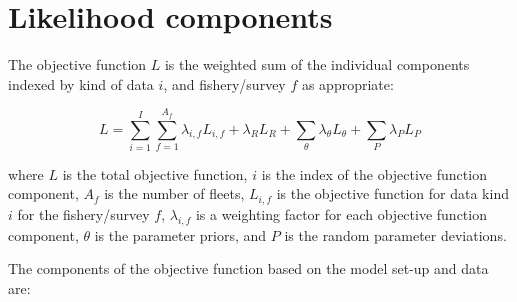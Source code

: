 \section{Likelihood components}

The objective function $L$ is the weighted sum of the individual components
indexed by kind of data $i$, and fishery/survey $f$ as appropriate:

\begin{equation}
	L = \sum_{i=1}^{I}\sum_{f=1}^{A_f}\lambda_{i,f} L_{i,f}+\lambda_R L_R + \sum_{\theta}^{}\lambda_\theta L_\theta + \sum_{P}^{}\lambda_P L_P
\end{equation}

where $L$ is the total objective function, $i$ is the index of the objective
function component, $A_f$ is the number of fleets, $L_{i,f}$ is the
objective function for data kind $i$ for the fishery/survey $f$,
$\lambda_{i,f}$ is a weighting factor for each objective function component,
$\theta$ is the parameter priors, and $P$ is the random parameter deviations.

The components of the objective function based on the model set-up and data are: 

